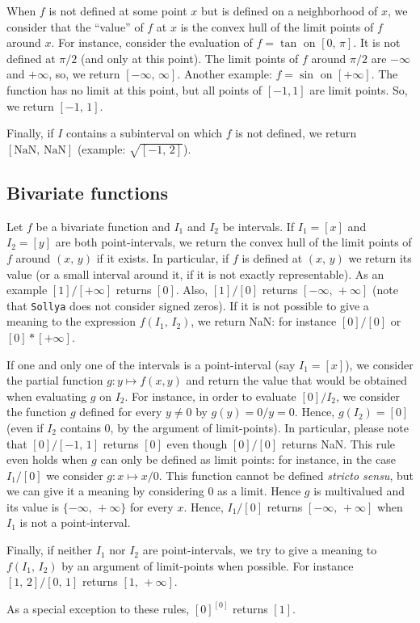 \documentclass[a4paper]{article}
\newcommand{\sollya}{\texttt{Sollya}\xspace}
\begin{document}
When $f$ is not defined at some point $x$ but is defined on a neighborhood of $x$, we consider that the ``value'' of $f$ at $x$ is the convex hull of the limit points of $f$ around $x$. For instance, consider the evaluation of $f= \tan$ on $[0,\, \pi]$. It is not defined at $\pi/2$ (and only at this point). The limit points of $f$ around $\pi/2$ are $-\infty$ and $+\infty$, so, we return $[-\infty,\,\infty]$. Another example: $f=\sin$ on $[+\infty]$. The function has no limit at this point, but all points of $[-1, 1]$ are limit points. So, we return $[-1,\,1]$.

Finally, if $I$ contains a subinterval on which $f$ is not defined, we return $[\textrm{NaN},\,\textrm{NaN}]$ (example: $\sqrt{[-1,\,2]}$).

\subsection{Bivariate functions}
Let $f$ be a bivariate function and $I_1$ and $I_2$ be intervals. If $I_1=[x]$ and $I_2=[y]$ are both point-intervals, we return the convex hull of the limit points of $f$ around $(x,\,y)$ if it exists. In particular, if $f$ is defined at $(x,\,y)$ we return its value (or a small interval around it, if it is not exactly representable). As an example $[1]/[+\infty]$ returns $[0]$. Also, $[1]/[0]$ returns $[-\infty,\,+\infty]$ (note that \sollya does not consider signed zeros). If it is not possible to give a meaning to the expression $f(I_1,\,I_2)$, we return NaN: for instance $[0]/[0]$ or $[0]*[+\infty]$.

If one and only one of the intervals is a point-interval (say $I_1 = [x]$), we consider the partial function $g: y \mapsto f(x,y)$ and return the value that would be obtained when evaluating $g$ on $I_2$. For instance, in order to evaluate $[0]/I_2$, we consider the function $g$ defined for every $y \neq 0$ by $g(y)=0/y=0$. Hence, $g(I_2) = [0]$ (even if $I_2$ contains $0$, by the argument of limit-points). In particular, please note that $[0]/[-1,\,1]$ returns $[0]$ even though $[0]/[0]$ returns NaN. This rule even holds when $g$ can only be defined as limit points: for instance, in the case $I_1/[0]$ we consider $g: x \mapsto x/0$. This function cannot be defined \emph{stricto sensu}, but we can give it a meaning by considering $0$ as a limit. Hence $g$ is multivalued and its value is $\{-\infty,\,+\infty\}$ for every $x$. Hence, $I_1/[0]$ returns $[-\infty,\,+\infty]$ when $I_1$ is not a point-interval.

Finally, if neither $I_1$ nor $I_2$ are point-intervals, we try to give a meaning to $f(I_1,\,I_2)$ by an argument of limit-points when possible. For instance $[1,\,2] / [0,\,1]$ returns $[1,\,+\infty]$.

As a special exception to these rules, $[0]^{[0]}$ returns $[1]$.
\end{document}
